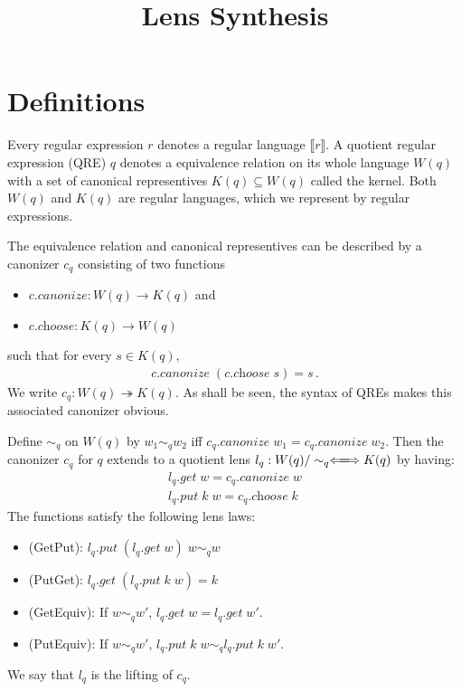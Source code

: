 \documentclass[a4paper,11pt] {article}
\theoremstyle{definition}
\newcommand{\lget}[1]{\textit{$#1$.get}}
\newcommand{\lput}[1]{\textit{$#1$.put}}
\newcommand{\lcreate}[1]{\textit{$#1$.create}}
\newcommand{\lcanonize}[1]{\textit{$#1$.canonize}}
\newcommand{\lchoose}[1]{\textit{$#1$.choose}}
\newcommand{\canon}{\twoheadrightarrow}
\newcommand{\lensbetween}[1]{\xLongleftrightarrow{#1}}
\newcommand{\name}[1]{\textsf{#1}}
\begin{document}
\title{Lens Synthesis}
\date{}
\maketitle



\section{Definitions}
\label{sec:definitions}
Every regular expression $r$ denotes a regular language $\llbracket r \rrbracket$.
A quotient regular expression (QRE) $q$ denotes a equivalence relation
on its whole language $W(q)$ with a set of canonical representives
$K(q) \subseteq W(q)$ called the kernel.
Both $W(q)$ and $K(q)$ are regular
languages, which we represent by regular expressions.

The equivalence relation and canonical representives 
can be described by a canonizer $c_q$
consisting of two functions
\begin{itemize}
\item $\lcanonize{c}: W(q) \to K(q)$ and
\item $\lchoose{c}: K(q) \to W(q)$
\end{itemize}
such that for every $s \in K(q)$,
\begin{align*}
  \lcanonize{c} \; (\lchoose{c} \; s) = s \, .
\end{align*}
We write $c_q: W(q) \canon K(q)$.
As shall be seen, the syntax of QREs makes this associated canonizer obvious.

Define $\sim_q$ on $W(q)$ by $w_1 \sim_q w_2$ iff
$\lcanonize{c_q} \; w_1 = \lcanonize{c_q} \; w_2$.
Then the canonizer $c_q$ for $q$ extends to a quotient lens
$l_q: W(q)/\sim_q \lensbetween{} K(q)$ by having:
\begin{gather*}
  \lget{l_q} \; w = \lcanonize{c_q} \; w\\
  \lput{l_q} \; k \; w = \lchoose{c_q} \; k 
\end{gather*}
The functions satisfy the following lens laws:
\begin{itemize}
\item (\name{GetPut}): $\lput{l_q} \; (\lget{l_q} \; w) \; w \sim_q w$ 
\item (\name{PutGet}): $\lget{l_q} \; (\lput{l_q} \; k \; w) = k$
\item (\name{GetEquiv}): If $w \sim_q w'$,
  $\lget{l_q} \; w = \lget{l_q} \; w'$.
\item (\name{PutEquiv}): If $w \sim_q w'$,
  $\lput{l_q} \; k \; w \sim_q \lput{l_q} \; k \; w'$.
\end{itemize}
We say that $l_q$ is the lifting of $c_q$.
\end{document}
